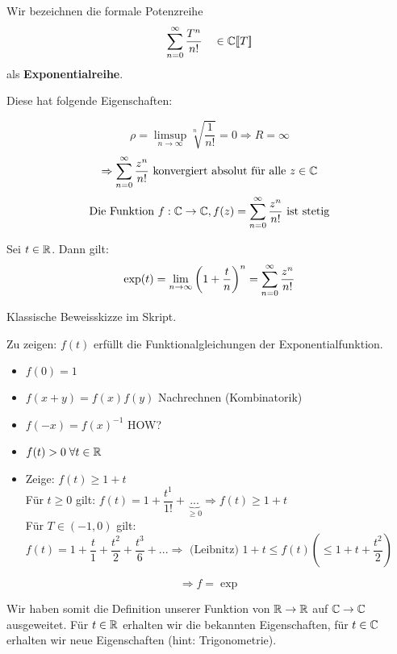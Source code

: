 \documentclass[main.tex]{subfiles}
\begin{document}
\begin{Definition}[Exponentialreihe]
  Wir bezeichnen die formale Potenzreihe
  $$\sum \limits_{n = 0}^\infty \dfrac{T^n}{n!} \quad \in \mathbb{C} [\![T]\!]$$
  als \textbf{Exponentialreihe}.

  Diese hat folgende Eigenschaften:
  \begin{Theorem}
    $$\rho = \limsup_{n \to \infty} \sqrt[n]{\dfrac{1}{n!}} = 0 \Rightarrow R = \infty$$
    $$\Rightarrow \sum \limits_{n=0}^\infty \dfrac{z^n}{n!} \text{ konvergiert absolut für alle $z \in \mathbb{C}$}$$
    $$\text{Die Funktion } f: \mathbb{C} \to \mathbb{C}, f(z) = \sum \limits_{n=0}^\infty\dfrac{z^n}{n!} \text{ ist stetig}$$
  \end{Theorem}
\end{Definition}

\begin{Theorem}
  Sei $t\in \mathbb{R}$. Dann gilt:
  $$\exp(t) = \lim \limits_{n \to \infty} \left(1 + \dfrac{t}{n}\right)^n = \sum \limits_{n=0}^\infty \dfrac{z^n}{n!}$$
\end{Theorem}

\begin{Beweis}
  Klassische Beweisskizze im Skript.

  Zu zeigen: $f(t)$ erfüllt die Funktionalgleichungen der Exponentialfunktion.
  \begin{itemize}
    \item $f(0) = 1$ \checkmark
    \item $f(x+y) = f(x)f(y)$ Nachrechnen (Kombinatorik) \checkmark
    \item $f(-x) = f(x)^{-1}$ HOW?
    \item $f(t) > 0 \;\forall t \in \mathbb{R}$ \checkmark
    \item Zeige: $f(t) \geq 1+t$\\
      Für $t \geq 0$ gilt: $f(t) = 1 + \dfrac{t^1}{1!} + \underbrace{ ... }_{\geq 0} \Rightarrow f(t) \geq 1+t$\\
      Für $T \in (-1,0)$ gilt: $f(t) = 1 + \dfrac{t}{1} + \dfrac{t^2}{2} + \dfrac{t^3}{6} + ... \Rightarrow \text{ (Leibnitz) } 1+t \leq f(t) ( \leq 1 + t + \dfrac{t^2}{2})$
  \end{itemize}
  $$\Rightarrow f = \exp$$
\end{Beweis}

\begin{Bemerkung}
  Wir haben somit die Definition unserer Funktion von $\mathbb{R} \to \mathbb{R}$ auf $\mathbb{C} \to \mathbb{C}$ ausgeweitet. Für $t\in \mathbb{R}$ erhalten wir die bekannten Eigenschaften, für $t \in \mathbb{C}$ erhalten wir neue Eigenschaften (hint: Trigonometrie).
\end{Bemerkung}
\end{document}
